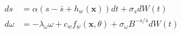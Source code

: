 \begin{align}
    ds &= \alpha(s-\bar{s}+h_w(\mathbf x)) dt + \sigma_s dW(t) \\
    d\omega &= -\lambda_\omega \omega + c_w f_w(\mathbf x,\theta) + \sigma_\omega B^{-s/\bar{s}} dW(t)
\end{align}